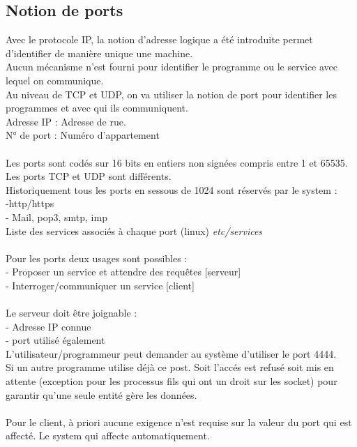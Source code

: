 \documentclass{article}
\begin{document}
\subsection{Notion de ports}
Avec le protocole IP, la notion d'adresse logique a été introduite permet d'identifier de manière unique une machine. \\ 
Aucun mécanisme n'est fourni pour identifier le programme ou le service avec lequel on communique. \\
Au niveau de TCP et UDP, on va utiliser la notion de port pour identifier les programmes et avec qui ils communiquent. \\
Adresse IP : Adresse de rue. \\
N° de port : Numéro d'appartement \\
\\ Les ports sont codés sur 16 bits en entiers non signées compris entre 1 et 65535. \\
Les ports TCP et UDP sont différents. \\
Historiquement tous les ports en sessous de 1024 sont réservés par le system : \\
-http/https \\
- Mail, pop3, smtp, imp \\
Liste des services associés à chaque port (linux) \textit{etc/services} \\
\\
Pour les ports deux usages sont possibles : \\
- Proposer un service et attendre des requêtes [serveur]\\
- Interroger/communiquer un service [client]\\
\\
Le serveur doit être joignable : \\
- Adresse IP connue \\
- port utilisé également \\
L'utilisateur/programmeur peut demander au système d'utiliser le port 4444. \\
Si un autre programme utilise déjà ce post. Soit l'accés est refusé soit mis en attente (exception pour les processus fils qui ont un droit sur les socket) pour garantir qu'une seule entité gère les données. \\
\\
Pour le client, à priori aucune exigence n'est requise sur la valeur du port qui est affecté. Le system qui affecte automatiquement. \\
\newpage
\end{document}
